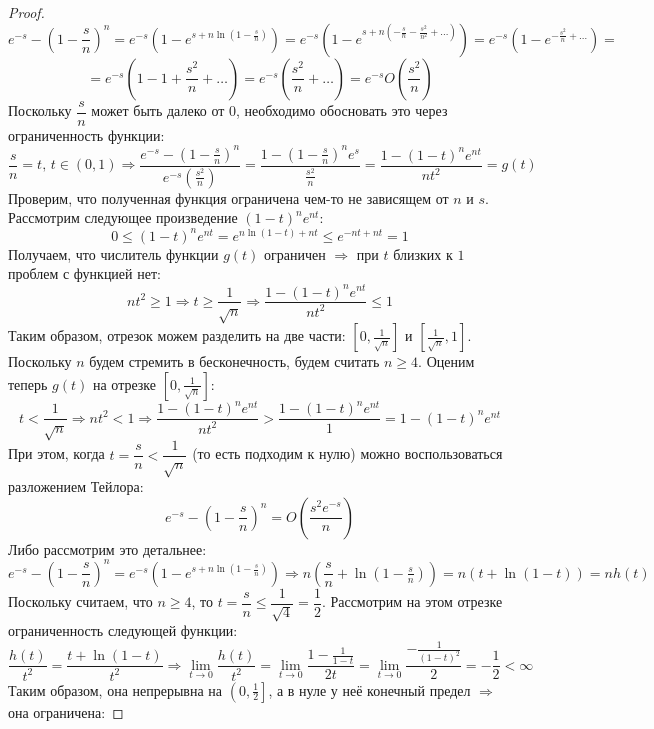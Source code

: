 \documentclass[12pt]{article}
\theoremstyle{definition}
\begin{document}
\begin{proof}
	$$
		e^{-s} - \left(1 - \dfrac{s}{n}\right)^n = e^{-s}\left(1 - e^{s + n\ln{\left(1 - \tfrac{s}{n}\right)}}\right) = e^{-s}\left(1 - e^{s + n\left(-\tfrac{s}{n} - \tfrac{s^2}{n^2} + \dotsc \right)}\right) = e^{-s}\left(1 - e^{-\tfrac{s^2}{n} + \dotsc}\right) =
	$$
	$$
		= e^{-s}\left(1 - 1 + \dfrac{s^2}{n} + \dotsc\right) = e^{-s}\left(\dfrac{s^2}{n} + \dotsc\right) = e^{-s}O\left(\dfrac{s^2}{n}\right)
	$$
	Поскольку $\dfrac{s}{n}$ может быть далеко от $0$, необходимо обосновать это через ограниченность функции:
	$$
		\dfrac{s}{n} = t, \, t\in (0,1) \Rightarrow \dfrac{e^{-s} - \left(1 - \tfrac{s}{n}\right)^n}{e^{-s}\left(\tfrac{s^2}{n}\right)} = \dfrac{1 - \left(1 - \tfrac{s}{n}\right)^n e^s}{\tfrac{s^2}{n}} =  \dfrac{1 - \left(1 - t\right)^ne^{nt}}{nt^2} = g(t)
	$$
	Проверим, что полученная функция ограничена чем-то не зависящем от $n$ и $s$. Рассмотрим следующее произведение $(1 -t)^ne^{nt}$:
	$$
		0 \leq (1 -t)^ne^{nt} = e^{n\ln{(1 - t)} + nt} \leq e^{-nt + nt} = 1
	$$
	Получаем, что числитель функции $g(t)$ ограничен $\Rightarrow$ при $t$ близких к $1$ проблем с функцией нет:
	$$
		nt^2 \geq 1 \Rightarrow t \geq \dfrac{1}{\sqrt{n}} \Rightarrow  \dfrac{1 - \left(1 - t\right)^ne^{nt}}{nt^2} \leq 1
	$$
	Таким образом, отрезок можем разделить на две части: $\left[0,\tfrac{1}{\sqrt{n}}\right]$ и $\left[\tfrac{1}{\sqrt{n}},1\right]$. Поскольку $n$ будем стремить в бесконечность, будем считать $n \geq 4$. Оценим теперь $g(t)$ на отрезке $\left[0,\tfrac{1}{\sqrt{n}}\right]$:
	$$
		t < \dfrac{1}{\sqrt{n}} \Rightarrow nt^2 < 1 \Rightarrow \dfrac{1 - \left(1 - t\right)^ne^{nt}}{nt^2} > \dfrac{1 - (1 - t)^ne^{nt}}{1} = 1 - (1 - t)^ne^{nt}
	$$
	При этом, когда $t = \dfrac{s}{n} < \dfrac{1}{\sqrt{n}}$ (то есть подходим к нулю) можно воспользоваться разложением Тейлора:
	$$
		e^{-s} - \left(1 - \dfrac{s}{n}\right)^n = O\left(\dfrac{s^2e^{-s}}{n}\right)
	$$
	Либо рассмотрим это детальнее:
	$$
		e^{-s} - \left(1 - \dfrac{s}{n}\right)^n = e^{-s}\left(1 - e^{s + n\ln{\left(1 - \tfrac{s}{n}\right)}}\right) \Rightarrow n\left(\dfrac{s}{n} + \ln{\left(1 - \tfrac{s}{n}\right)}\right) = n\left(t + \ln{(1 - t)}\right) = n h(t)
	$$
	Поскольку считаем, что $n \geq 4$, то $t = \dfrac{s}{n} \leq \dfrac{1}{\sqrt{4}} = \dfrac{1}{2}$. Рассмотрим на этом отрезке ограниченность следующей функции:
	$$
		\dfrac{h(t)}{t^2} = \dfrac{t + \ln{(1 - t)}}{t^2} \Rightarrow \lim\limits_{t \to 0}\dfrac{h(t)}{t^2} = \lim\limits_{t \to 0}\dfrac{1 - \tfrac{1}{1-t}}{2t} = \lim\limits_{t \to 0}\dfrac{ - \tfrac{1}{(1-t)^2}}{2} = -\dfrac{1}{2} < \infty
	$$
	Таким образом, она непрерывна на $\left(0,\tfrac{1}{2}\right]$, а в нуле у неё конечный предел $\Rightarrow$ она ограничена:

\end{proof}
\end{document}
